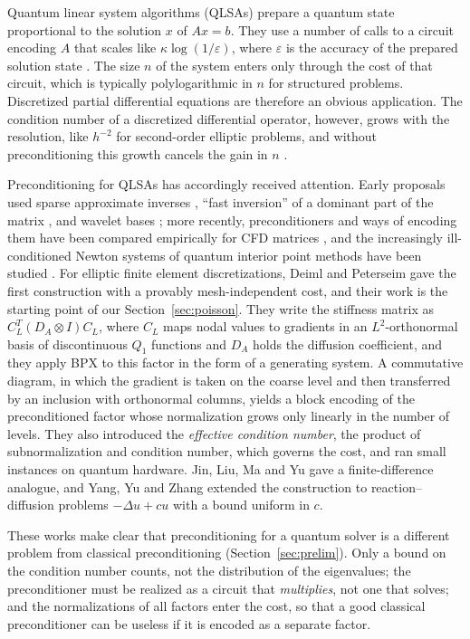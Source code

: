 \documentclass[11pt,a4paper]{article}
\theoremstyle{remark}
\begin{document}
Quantum linear system algorithms (QLSAs) prepare a quantum state proportional
to the solution $x$ of $Ax=b$. They use a number of calls to a circuit
encoding $A$ that scales like $\kappa\log(1/\varepsilon)$, where $\varepsilon$ is the accuracy of
the prepared solution state \cite{CKS17,GSLW19,Costa22}. The size $n$ of the
system enters only through the cost of that circuit, which is typically
polylogarithmic in $n$ for structured problems. Discretized partial
differential equations are therefore an obvious application. The condition
number of a discretized differential operator, however, grows with the
resolution, like $h^{-2}$ for second-order elliptic problems, and without
preconditioning this growth cancels the gain in $n$ \cite{MP16,LMS22}.

Preconditioning for QLSAs has accordingly received attention. Early
proposals used sparse approximate inverses \cite{CJS13}, ``fast inversion''
of a dominant part of the matrix \cite{TAWL21}, and wavelet bases
\cite{BNWA23}; more recently, preconditioners and ways of encoding them
have been compared empirically for CFD matrices \cite{LS25}, and the
increasingly ill-conditioned Newton systems of quantum interior point
methods have been studied \cite{QIPMreview}. For elliptic finite element
discretizations, Deiml and Peterseim \cite{DP26} gave the first construction
with a provably mesh-independent cost, and their work is the starting point
of our Section~\ref{sec:poisson}. They write the stiffness matrix as
$C_L^T(D_A\otimes I)C_L$, where $C_L$ maps nodal values to gradients in an
$L^2$-orthonormal basis of discontinuous $Q_1$ functions and $D_A$ holds the
diffusion coefficient, and they apply BPX to this factor in the form of a
generating system. A commutative diagram, in which the gradient is taken on
the coarse level and then transferred by an inclusion with orthonormal
columns, yields a block encoding of the preconditioned factor whose
normalization grows only linearly in the number of levels. They also
introduced the \emph{effective condition number}, the product of
subnormalization and condition number, which governs the cost, and ran
small instances on quantum hardware. Jin, Liu, Ma and Yu \cite{JLMY25} gave a
finite-difference analogue, and Yang, Yu and Zhang \cite{YYZ26} extended the
construction to reaction--diffusion problems $-\Delta u+cu$ with a bound
uniform in $c$.

These works make clear that preconditioning for a quantum solver is a
different problem from classical preconditioning
(Section~\ref{sec:prelim}). Only a bound on the condition number counts, not
the distribution of the eigenvalues; the preconditioner must be realized as
a circuit that \emph{multiplies}, not one that solves; and the
normalizations of all factors enter the cost, so that a good classical
preconditioner can be useless if it is encoded as a separate factor.
\end{document}
